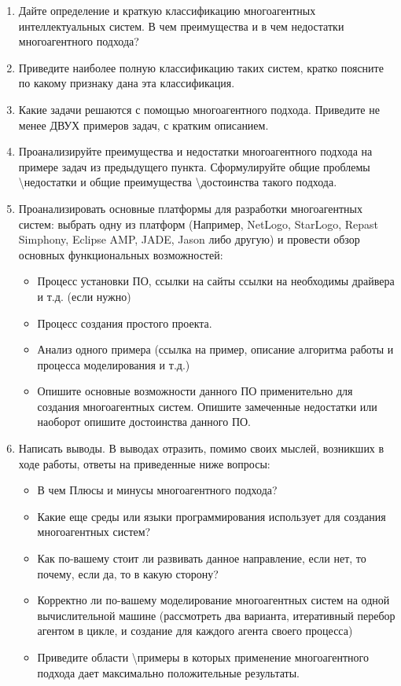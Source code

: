 \documentclass[14pt,a4paper,report]{report}
\begin{document}
\begin{enumerate}
	\item Дайте определение и краткую классификацию многоагентных интеллектуальных систем.	В чем преимущества и в чем недостатки многоагентного подхода?
	\item Приведите наиболее полную классификацию таких систем, кратко поясните по какому признаку дана эта классификация.
	\item Какие задачи решаются с помощью многоагентного подхода. Приведите не менее ДВУХ примеров задач, с кратким описанием.
	\item Проанализируйте преимущества и недостатки многоагентного подхода на примере задач из предыдущего пункта. Сформулируйте общие проблемы \textbackslash недостатки и общие преимущества \textbackslash достоинства такого подхода.
	\item Проанализировать основные платформы для разработки многоагентных систем: выбрать одну из платформ (Например, NetLogo, StarLogo, Repast Simphony, Eclipse AMP, JADE, Jason либо другую) и провести обзор основных функциональных возможностей:
	\begin{itemize}
		\item Процесс установки ПО, ссылки на сайты ссылки на необходимы драйвера и т.д. (если нужно)
		\item Процесс создания простого проекта.
		\item Анализ одного примера (ссылка на пример, описание алгоритма работы и процесса моделирования и т.д.)
		\item Опишите основные возможности данного ПО применительно для создания многоагентных систем. Опишите замеченные недостатки или наоборот опишите достоинства данного ПО.
	\end{itemize}
	\item Написать выводы. В выводах отразить, помимо своих мыслей, возникших в ходе работы, ответы на приведенные ниже вопросы:
	\begin{itemize}
		\item В чем Плюсы и минусы многоагентного подхода?
		\item Какие еще среды или языки программирования использует для создания многоагентных систем?
		\item Как по-вашему стоит ли развивать данное направление, если нет, то почему, если да, то в какую сторону?
		\item Корректно ли по-вашему моделирование многоагентных систем на одной вычислительной машине (рассмотреть два варианта, итеративный перебор агентом в цикле, и создание для каждого агента своего процесса)
		\item Приведите области \textbackslash примеры в которых применение многоагентного подхода дает максимально положительные результаты.
	\end{itemize}
\end{enumerate}
\end{document}
